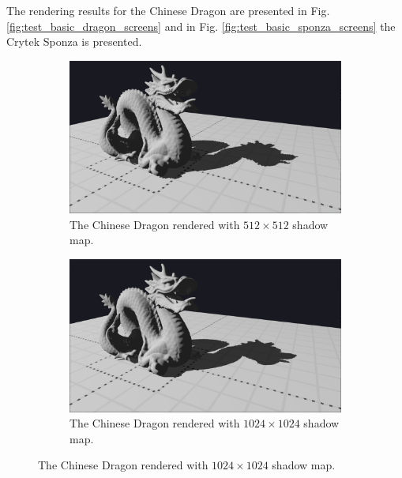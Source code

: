 The rendering results for the Chinese Dragon are presented in Fig. \ref{fig:test_basic_dragon_screens} and in Fig. \ref{fig:test_basic_sponza_screens} the Crytek Sponza is presented.
\begin{figure}
    \centering
    \begin{subfigure}{0.48\textwidth}
		\centering
        \includegraphics[width=\textwidth]{./graf/tests/basic/cropped/dragon_basic_fhd_512.png}
        \caption{The Chinese Dragon rendered with \(512\times 512\) shadow map.}
    \end{subfigure}
	\hfill
    \begin{subfigure}{0.48\textwidth}
		\centering
        \includegraphics[width=\textwidth]{./graf/tests/basic/cropped/dragon_basic_fhd_1024.png}
        \caption{The Chinese Dragon rendered with \(1024\times 1024\) shadow map.}
    \end{subfigure}


\end{figure}
